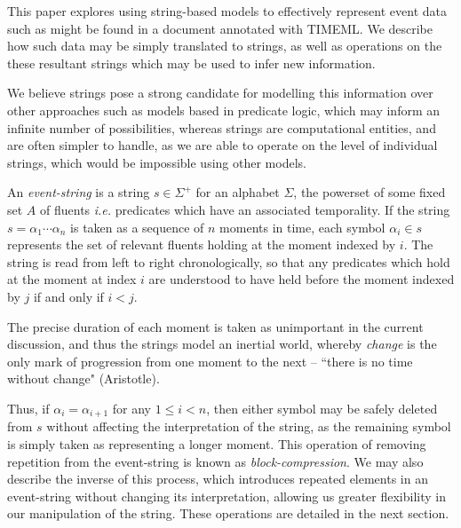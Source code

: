 \documentclass[a4paper,11pt]{article}
\begin{document}
This paper explores using string-based models to effectively represent event 
data such as might be found in a document annotated with TIMEML. We describe 
how such data may be simply translated to strings, as well as operations on the 
these resultant strings which may be used to infer new information.

We believe strings pose a strong candidate for modelling this information over 
other approaches such as models based in predicate logic, which may inform an 
infinite number of possibilities, whereas strings are computational entities, 
and are often simpler to handle, as we are able to operate on the level of 
individual strings, which would be impossible using other models.

An \textit{event-string} is a string $s \in \Sigma^+$ for an alphabet 
$\Sigma$, the powerset of some fixed set $A$ of fluents \textit{i.e.} 
predicates which have an associated temporality. If the 
string $s = \alpha_1\cdots\alpha_n$ is taken as a sequence of $n$ moments in 
time, each symbol $\alpha_i \in s$ represents the set of relevant fluents 
holding at the 
moment indexed by $i$. The string is read from left to right chronologically, 
so that any predicates which hold at the moment at index $i$ are understood to 
have held before the moment indexed by $j$ if and only if $i < j$.

The precise duration of each moment is taken as unimportant in the current 
discussion, 
and thus the strings model an inertial world, whereby \textit{change} is the 
only mark of progression from one moment to the next -- ``there is no time 
without change" (Aristotle).

Thus, if $\alpha_i = \alpha_{i+1}$ for any 
$1 \leq i < n$, then either symbol may be safely deleted from $s$ without 
affecting the interpretation of the string, as the remaining symbol is simply 
taken as representing a longer moment. This operation of removing 
repetition from 
the event-string is known as \textit{block-compression}. We may also describe 
the inverse of this process, which introduces repeated elements in an 
event-string without changing its interpretation, allowing us greater 
flexibility in our manipulation of the string. These operations are detailed 
in the next section.
\end{document}
